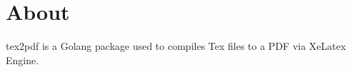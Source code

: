 \section{About}

tex2pdf is a Golang package used to compiles Tex files to a PDF via XeLatex Engine.
